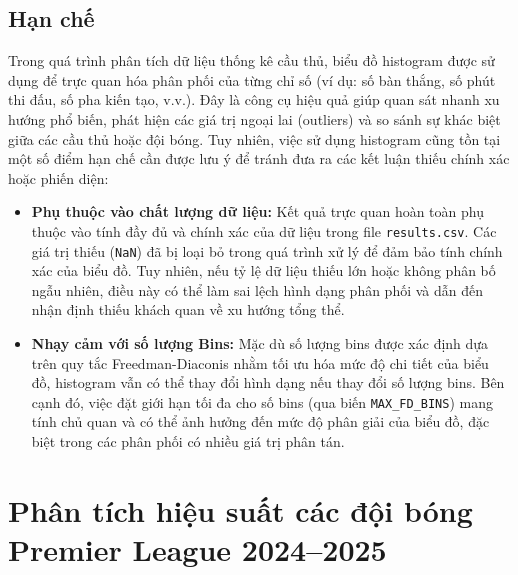 \documentclass[12pt, a4paper]{report}
\begin{document}
\subsection{Hạn chế}
Trong quá trình phân tích dữ liệu thống kê cầu thủ, biểu đồ histogram được sử dụng để trực quan hóa phân phối của từng chỉ số (ví dụ: số bàn thắng, số phút thi đấu, số pha kiến tạo, v.v.).
Đây là công cụ hiệu quả giúp quan sát nhanh xu hướng phổ biến, phát hiện các giá trị ngoại lai (outliers) và so sánh sự khác biệt giữa các cầu thủ hoặc đội bóng.
Tuy nhiên, việc sử dụng histogram cũng tồn tại một số điểm hạn chế cần được lưu ý để tránh đưa ra các kết luận thiếu chính xác hoặc phiến diện:
\begin{itemize}
    \item \textbf{Phụ thuộc vào chất lượng dữ liệu:} Kết quả trực quan hoàn toàn phụ thuộc vào tính đầy đủ và chính xác của dữ liệu trong file \texttt{results.csv}. Các giá trị thiếu (\texttt{NaN}) đã bị loại bỏ trong quá trình xử lý để đảm bảo tính chính xác của biểu đồ. Tuy nhiên, nếu tỷ lệ dữ liệu thiếu lớn hoặc không phân bố ngẫu nhiên, điều này có thể làm sai lệch hình dạng phân phối và dẫn đến nhận định thiếu khách quan về xu hướng tổng thể.
    \item \textbf{Nhạy cảm với số lượng Bins:} Mặc dù số lượng bins được xác định dựa trên quy tắc Freedman-Diaconis nhằm tối ưu hóa mức độ chi tiết của biểu đồ, histogram vẫn có thể thay đổi hình dạng nếu thay đổi số lượng bins. Bên cạnh đó, việc đặt giới hạn tối đa cho số bins (qua biến \texttt{MAX\_FD\_BINS}) mang tính chủ quan và có thể ảnh hưởng đến mức độ phân giải của biểu đồ, đặc biệt trong các phân phối có nhiều giá trị phân tán.
\end{itemize}

\section{Phân tích hiệu suất các đội bóng Premier League 2024–2025}
\end{document}
